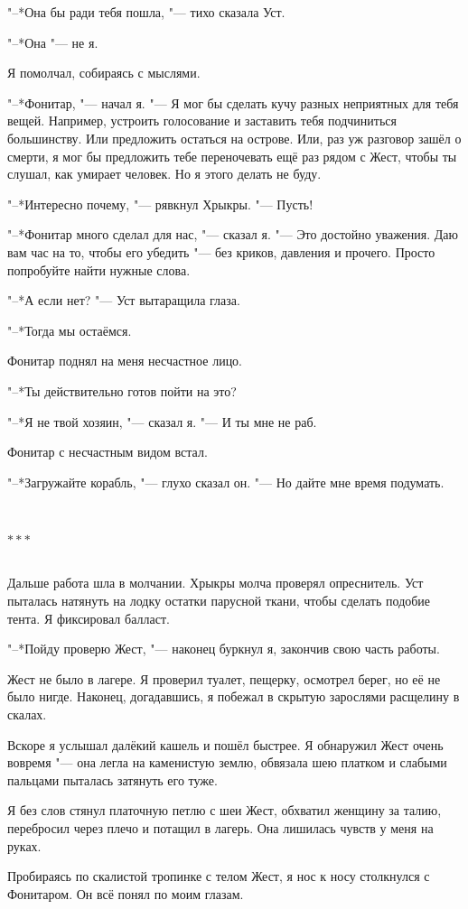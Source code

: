 \documentclass[a4paper,12pt,fleqn]{book}
\newcommand{\razd}{~\\{\centering\Large\bfseries$\ast \ast \ast$\par}~\\}
\begin{document}
"--*Она бы ради тебя пошла, "--- тихо сказала Уст.

"--*Она "--- не я.

Я помолчал, собираясь с мыслями.

"--*Фонитар, "--- начал я.
"--- Я мог бы сделать кучу разных неприятных для тебя вещей.
Например, устроить голосование и заставить тебя подчиниться большинству.
Или предложить остаться на острове.
Или, раз уж разговор зашёл о смерти, я мог бы предложить тебе переночевать ещё раз рядом с Жест, чтобы ты слушал, как умирает человек.
Но я этого делать не буду.

"--*Интересно почему, "--- рявкнул Хрыкры.
"--- Пусть!

"--*Фонитар много сделал для нас, "--- сказал я.
"--- Это достойно уважения.
Даю вам час на то, чтобы его убедить "--- без криков, давления и прочего.
Просто попробуйте найти нужные слова.

"--*А если нет? "--- Уст вытаращила глаза.

"--*Тогда мы остаёмся.

Фонитар поднял на меня несчастное лицо.

"--*Ты действительно готов пойти на это?

"--*Я не твой хозяин, "--- сказал я.
"--- И ты мне не раб.

Фонитар с несчастным видом встал.

"--*Загружайте корабль, "--- глухо сказал он.
"--- Но дайте мне время подумать.

\razd

Дальше работа шла в молчании.
Хрыкры молча проверял опреснитель.
Уст пыталась натянуть на лодку остатки парусной ткани, чтобы сделать подобие тента.
Я фиксировал балласт.

"--*Пойду проверю Жест, "--- наконец буркнул я, закончив свою часть работы.

Жест не было в лагере.
Я проверил туалет, пещерку, осмотрел берег, но её не было нигде.
Наконец, догадавшись, я побежал в скрытую зарослями расщелину в скалах.

Вскоре я услышал далёкий кашель и пошёл быстрее.
Я обнаружил Жест очень вовремя "--- она легла на каменистую землю, обвязала шею платком и слабыми пальцами пыталась затянуть его туже.

Я без слов стянул платочную петлю с шеи Жест, обхватил женщину за талию, перебросил через плечо и потащил в лагерь.
Она лишилась чувств у меня на руках.

Пробираясь по скалистой тропинке с телом Жест, я нос к носу столкнулся с Фонитаром.
Он всё понял по моим глазам.
\end{document}
